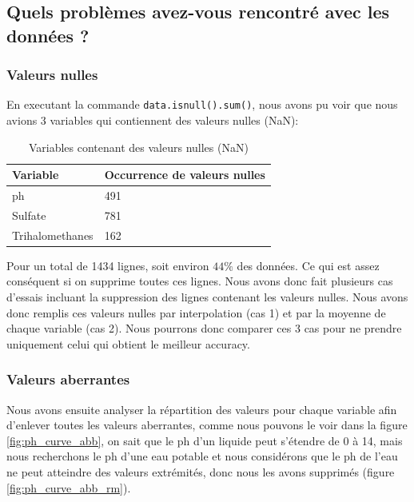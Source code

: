 \documentclass[12pt, a4paper]{article}
\begin{document}
\subsection{Quels problèmes avez-vous rencontré avec les données ?}
    \subsubsection{Valeurs nulles}
    En executant la commande \texttt{data.isnull().sum()}, nous avons pu voir que nous avions 3 variables qui contiennent des valeurs nulles (NaN):
   \begin{table}[H]
            \caption{Variables contenant des valeurs nulles (NaN)}
            \centering
            \begin{tabular}{| p{} | p{} |} 
             \hline
             \textbf{Variable} & \textbf{Occurrence de valeurs nulles} \\
             \hline
             ph & 491 \\ [.4ex] 
             \hline
             Sulfate & 781 \\ [.4ex] 
             \hline
             Trihalomethanes & 162 \\ [1ex] 
             \hline
        \end{tabular}
        \label{table:connotation weproov}
    \end{table}
    
    
    Pour un total de 1434 lignes, soit environ $44\%$ des données. Ce qui est assez conséquent si on supprime toutes ces lignes. Nous avons donc fait plusieurs cas d'essais incluant la suppression des lignes contenant les valeurs nulles. Nous avons donc remplis ces valeurs nulles par interpolation (cas 1) et par la moyenne de chaque variable (cas 2). Nous pourrons donc comparer ces 3 cas pour ne prendre uniquement celui qui obtient le meilleur accuracy.
    
    \subsubsection{Valeurs aberrantes}
    Nous avons ensuite analyser la répartition des valeurs pour chaque variable afin d'enlever toutes les valeurs aberrantes, comme nous pouvons le voir dans la figure \ref{fig:ph_curve_abb}, on sait que le ph d'un liquide peut s'étendre de 0 à 14, mais nous recherchons le ph d'une eau potable et nous considérons que le ph de l'eau ne peut atteindre des valeurs extrémités, donc nous les avons supprimés (figure \ref{fig:ph_curve_abb_rm}).
    
\end{document}
